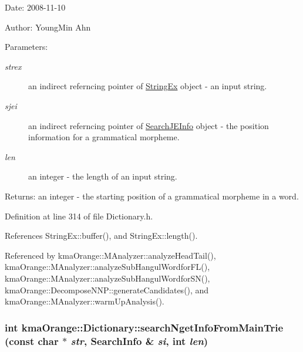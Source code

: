 \begin{Desc}
\item[Date:]2008-11-10 \end{Desc}
\begin{Desc}
\item[Author:]YoungMin Ahn \end{Desc}
\begin{Desc}
\item[Parameters:]
\begin{description}
\item[{\em strex}]an indirect referncing pointer of \hyperlink{classStringEx}{StringEx} object - an input string. \item[{\em sjei}]an indirect referncing pointer of \hyperlink{classSearchJEInfo}{SearchJEInfo} object - the position information for a grammatical morpheme. \item[{\em len}]an integer - the length of an input string. \end{description}
\end{Desc}
\begin{Desc}
\item[Returns:]an integer - the starting position of a grammatical morpheme in a word. \end{Desc}


Definition at line 314 of file Dictionary.h.

References StringEx::buffer(), and StringEx::length().

Referenced by kmaOrange::MAnalyzer::analyzeHeadTail(), kmaOrange::MAnalyzer::analyzeSubHangulWordforFL(), kmaOrange::MAnalyzer::analyzeSubHangulWordforSN(), kmaOrange::DecomposeNNP::generateCandidates(), and kmaOrange::MAnalyzer::warmUpAnalysis().\hypertarget{classkmaOrange_1_1Dictionary_dac1a4e1a10b17094b78caa60fc4d4be}{
\subsubsection[{searchNgetInfoFromMainTrie}]{\setlength{\rightskip}{0pt plus 5cm}int kmaOrange::Dictionary::searchNgetInfoFromMainTrie (const char $\ast$ {\em str}, \/  {\bf SearchInfo} \& {\em si}, \/  int {\em len})}}
\label{classkmaOrange_1_1Dictionary_dac1a4e1a10b17094b78caa60fc4d4be}


